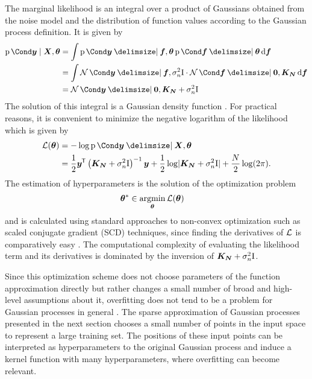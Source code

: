 The marginal likelihood is an integral over a product of Gaussians obtained from the noise model and the distribution of function values according to the Gaussian process definition.
It is given by
\begin{align}
    \begin{split}
        \label{eq:gp_f_marginalization}
        \Prob{\mat{y} \mid \mat{X}, \mat{\theta}} &= \int \Prob{\mat{y} \given \mat{f}, \mat{\theta}} \Prob{\mat{f} \given \mat{\theta}} \diff \mat{f} \\
        &= \int \Gaussian{\mat{y} \given \mat{f}, \sigma_n^2 \Eye} \cdot \Gaussian{\mat{f} \given \mat{0}, \mat{K_N}} \diff \mat{f} \\
        &= \Gaussian{\mat{y} \given \mat{0}, \mat{K_N} + \sigma_n^2 \Eye}
    \end{split}
\end{align}
The solution of this integral is a Gaussian density function \cite{petersen_matrix_2008}.
For practical reasons, it is convenient to minimize the negative logarithm of the likelihood which is given by
\begin{align}
    \begin{split}
        \Ell(\mat{\theta}) &= -\log\Prob{\mat{y} \given \mat{X}, \mat{\theta}} \\
        &= \frac{1}{2} \mat{y}\tran \left( \mat{K_N} + \sigma_n^2 \Eye \right)^{-1} \mat{y} +
        \frac{1}{2} \log \abs{\mat{K_N} + \sigma_n^2 \Eye} +
        \frac{N}{2} \log(2\pi).
    \end{split}
\end{align}
The estimation of hyperparameters is the solution of the optimization problem
\begin{align}
    \bm{\theta}^\ast &\in \operatorname*{argmin}_{\bm{\theta}} \operatorname{\mathcal{L}}(\bm{\theta})
\end{align}
and is calculated using standard approaches to non-convex optimization such as scaled conjugate gradient (SCD) techniques, since finding the derivatives of $\operatorname{\mathcal{L}}$ is comparatively easy \cite{rasmussen_gaussian_2006}.
The computational complexity of evaluating the likelihood term and its derivatives is dominated by the inversion of $\bm{K_N} + \sigma_n^2 \mathrm{I}$.

Since this optimization scheme does not choose parameters of the function approximation directly but rather changes a small number of broad and high-level assumptions about it, overfitting does not tend to be a problem for Gaussian processes in general \cite{snelson_flexible_2007}.
The sparse approximation of Gaussian processes presented in the next section chooses a small number of points in the input space to represent a large training set.
The positions of these input points can be interpreted as hyperparameters to the original Gaussian process and induce a kernel function with many hyperparameters, where overfitting can become relevant.

